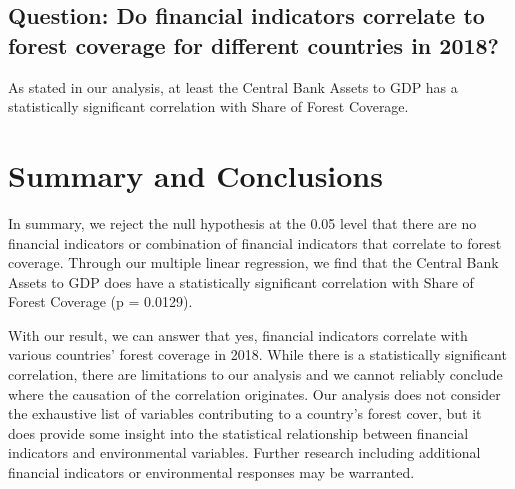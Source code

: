 \documentclass[
  12pt,
]{article}
\begin{document}
\hypertarget{question-do-financial-indicators-correlate-to-forest-coverage-for-different-countries-in-2018}{%
\subsection{Question: Do financial indicators correlate to forest
coverage for different countries in
2018?}\label{question-do-financial-indicators-correlate-to-forest-coverage-for-different-countries-in-2018}}

As stated in our analysis, at least the Central Bank Assets to GDP has a
statistically significant correlation with Share of Forest Coverage.

\newpage

\hypertarget{summary-and-conclusions}{%
\section{Summary and Conclusions}\label{summary-and-conclusions}}

In summary, we reject the null hypothesis at the 0.05 level that there
are no financial indicators or combination of financial indicators that
correlate to forest coverage. Through our multiple linear regression, we
find that the Central Bank Assets to GDP does have a statistically
significant correlation with Share of Forest Coverage (p = 0.0129).

With our result, we can answer that yes, financial indicators correlate
with various countries' forest coverage in 2018. While there is a
statistically significant correlation, there are limitations to our
analysis and we cannot reliably conclude where the causation of the
correlation originates. Our analysis does not consider the exhaustive
list of variables contributing to a country's forest cover, but it does
provide some insight into the statistical relationship between financial
indicators and environmental variables. Further research including
additional financial indicators or environmental responses may be
warranted.
\end{document}
